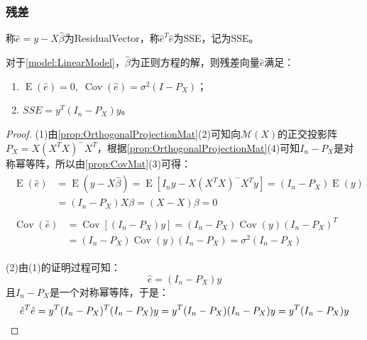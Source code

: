 \subsubsection{残差}
\begin{definition}
	称$\hat{e}=y-X\hat{\beta}$为\gls{ResidualVector}，称$\hat{e}^T\hat{e}$为\gls{SSE}，记为SSE。
\end{definition}
\begin{property}\label{prop:ehat}
	对于\cref{model:LinearModel}，$\hat{\beta}$为正则方程的解，则残差向量$\hat{e}$满足：
	\begin{enumerate}
		\item $\operatorname{E}(\hat{e})=0,\;\operatorname{Cov}(\hat{e})=\sigma^2(I-P_X)$；
		\item $SSE=y^T(I_n-P_X)y$。
	\end{enumerate}
\end{property}
\begin{proof}
	(1)由\cref{prop:OrthogonalProjectionMat}(2)可知向$\mathcal{M}(X)$的正交投影阵$P_X=X(X^TX)^-X^T$，根据\cref{prop:OrthogonalProjectionMat}(4)可知$I_n-P_X$是对称幂等阵，所以由\cref{prop:CovMat}(3)可得：
	\begin{gather*}
		\begin{aligned}
			\operatorname{E}(\hat{e})&=\operatorname{E}(y-X\hat{\beta})=\operatorname{E}[I_ny-X(X^TX)^-X^Ty]=(I_n-P_X)\operatorname{E}(y) \\
			&=(I_n-P_X)X\beta=(X-X)\beta=0
		\end{aligned} \\
		\begin{aligned}
			\operatorname{Cov}(\hat{e})&=\operatorname{Cov}[(I_n-P_X)y]=(I_n-P_X)\operatorname{Cov}(y)(I_n-P_X)^T \\
			&=(I_n-P_X)\operatorname{Cov}(y)(I_n-P_X)=\sigma^2(I_n-P_X)
		\end{aligned}
	\end{gather*}\par
	(2)由(1)的证明过程可知：
	\begin{equation*}
		\hat{e}=(I_n-P_X)y
	\end{equation*}
	且$I_n-P_X$是一个对称幂等阵，于是：
	\begin{equation*}
		\hat{e}^T\hat{e}=y^T(I_n-P_X)^T(I_n-P_X)y=y^T(I_n-P_X)(I_n-P_X)y=y^T(I_n-P_X)y\qedhere
	\end{equation*}
\end{proof}
